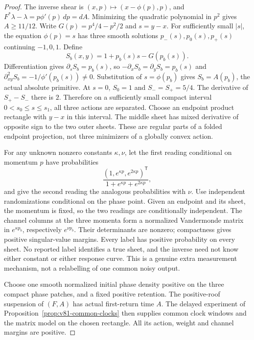 \begin{proof}
The inverse shear is $(x,p)\mapsto(x-\phi(p),p)$, and
$F^*\lambda-\lambda=p\phi'(p)\,dp=dA$.  Minimizing the quadratic
polynomial in $p^2$ gives $A\ge11/12$.  Write
$G(p)=p^4/4-p^2/2$ and $s=y-x$.  For sufficiently small $|s|$, the
equation $\phi(p)=s$ has three smooth solutions $p_-(s),p_0(s),p_+(s)$
continuing $-1,0,1$.  Define
\[
 S_b(x,y)=1+p_b(s)s-G(p_b(s)).
\]
Differentiation gives $\partial_sS_b=p_b(s)$, so
$-\partial_xS_b=\partial_yS_b=p_b(s)$ and
$\partial_{xy}^2S_b=-1/\phi'(p_b(s))\ne0$.  Substitution of
$s=\phi(p_b)$ gives $S_b=A(p_b)$, the actual absolute primitive.
At $s=0$, $S_0=1$ and $S_-=S_+=5/4$.  The derivative of
$S_+-S_-$ there is $2$.  Therefore on a sufficiently small compact
interval $0<s_0\le s\le s_1$, all three actions are separated.
Choose an endpoint product rectangle with $y-x$ in this interval.
The middle sheet has mixed derivative of opposite sign to the two
outer sheets.  These are regular parts of a folded endpoint projection,
not three minimizers of a globally convex action.

For any unknown nonzero constants $\kappa,\nu$, let the first reading
conditional on momentum $p$ have probabilities
\[
 \frac{(1,e^{\kappa p},e^{2\kappa p})^{\mathsf T}}
                   {1+e^{\kappa p}+e^{2\kappa p}},
\]
and give the second reading the analogous probabilities with $\nu$.
Use independent randomizations conditional on the phase point.  Given
an endpoint and its sheet, the momentum is fixed, so the two readings
are conditionally independent.  The channel columns at the three
momenta form a normalized Vandermonde matrix in $e^{\kappa p_b}$,
respectively $e^{\nu p_b}$.  Their determinants are nonzero; compactness
gives positive singular-value margins.  Every label has positive
probability on every sheet.  No reported label identifies a true sheet,
and the inverse need not know either constant or either response curve.
This is a genuine extra measurement mechanism, not a relabelling of
one common noisy output.

Choose one smooth normalized initial phase density positive on the
three compact phase patches, and a fixed positive retention.  The
positive-roof suspension of $(F,A)$ has actual first-return time $A$.
The delayed experiment of Proposition~\ref{prop:v81-common-clocks}
then supplies common clock windows and the matrix model on the chosen
rectangle.  All its action, weight and channel margins are positive.
\end{proof}

